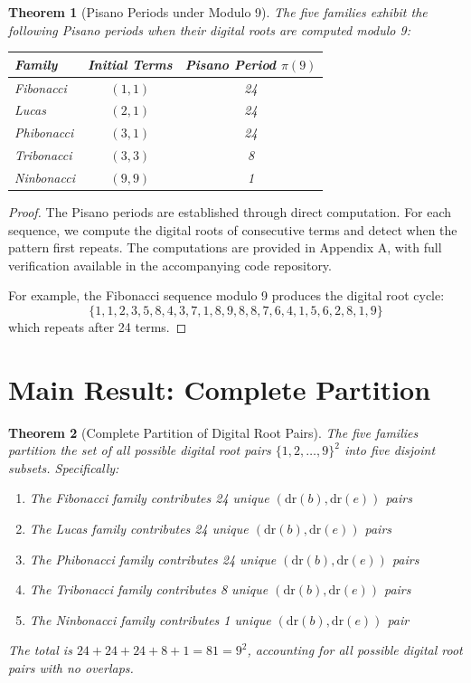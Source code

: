 \documentclass[12pt]{article}
\newtheorem{theorem}{Theorem}
\begin{document}
\begin{theorem}[Pisano Periods under Modulo 9]\label{thm:pisano}
The five families exhibit the following Pisano periods when their digital roots are computed modulo 9:

\begin{center}
\begin{tabular}{lcc}
\toprule
\textbf{Family} & \textbf{Initial Terms} & \textbf{Pisano Period $\pi(9)$} \\
\midrule
Fibonacci & $(1, 1)$ & 24 \\
Lucas & $(2, 1)$ & 24 \\
Phibonacci & $(3, 1)$ & 24 \\
Tribonacci & $(3, 3)$ & 8 \\
Ninbonacci & $(9, 9)$ & 1 \\
\bottomrule
\end{tabular}
\end{center}
\end{theorem}

\begin{proof}
The Pisano periods are established through direct computation. For each sequence, we compute the digital roots of consecutive terms and detect when the pattern first repeats. The computations are provided in Appendix A, with full verification available in the accompanying code repository.

For example, the Fibonacci sequence modulo 9 produces the digital root cycle:
\[
\{1, 1, 2, 3, 5, 8, 4, 3, 7, 1, 8, 9, 8, 8, 7, 6, 4, 1, 5, 6, 2, 8, 1, 9\}
\]
which repeats after 24 terms.
\end{proof}

\section{Main Result: Complete Partition}

\begin{theorem}[Complete Partition of Digital Root Pairs]\label{thm:main}
The five families partition the set of all possible digital root pairs $\{1, 2, \ldots, 9\}^2$ into five disjoint subsets. Specifically:

\begin{enumerate}
\item The Fibonacci family contributes 24 unique $(\text{dr}(b), \text{dr}(e))$ pairs
\item The Lucas family contributes 24 unique $(\text{dr}(b), \text{dr}(e))$ pairs
\item The Phibonacci family contributes 24 unique $(\text{dr}(b), \text{dr}(e))$ pairs
\item The Tribonacci family contributes 8 unique $(\text{dr}(b), \text{dr}(e))$ pairs
\item The Ninbonacci family contributes 1 unique $(\text{dr}(b), \text{dr}(e))$ pair
\end{enumerate}

The total is $24 + 24 + 24 + 8 + 1 = 81 = 9^2$, accounting for all possible digital root pairs with \emph{no overlaps}.
\end{theorem}
\end{document}
